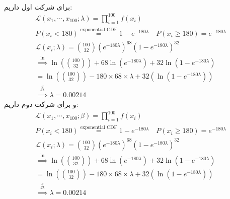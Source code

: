 \\
برای شرکت اول داریم:
\begin{gather*}
    \mathcal{L}(x_1,\cdots ,x_{100};\lambda) = \prod_{i=1}^{100} f(x_i)\\
    P(x_i < 180) \stackrel{\text{exponential CDF}}{=} 1 - e^{-180\lambda} \quad P(x_i \ge 180) = e^{-180\lambda}\\
    \mathcal{L}(x_i;\lambda) = {100 \choose 32} ( e^{-180\lambda})^{68} (1 - e^{-180\lambda})^{32}\\
    \stackrel{\ln}{\implies} \ln({100 \choose 32}) + 68 \ln( e^{-180\lambda}) + 32 \ln(1 - e^{-180\lambda})\\
    = \ln({100 \choose 32}) - 180 \times 68 \times \lambda + 32 (\ln(1 - e^{-180\lambda}))\\
    \stackrel{\frac{d}{d\lambda}}{\implies} \lambda = 0.00214
\end{gather*}
و برای شرکت دوم داریم:
\begin{gather*}
    \mathcal{L}(x_1,\cdots ,x_{100};\beta) = \prod_{i=1}^{100} f(x_i)\\
    P(x_i < 180) \stackrel{\text{exponential CDF}}{=} 1 - e^{-180\lambda} \quad P(x_i \ge 180) = e^{-180\lambda}\\
    \mathcal{L}(x_i;\lambda) = {100 \choose 32} ( e^{-180\lambda})^{68} (1 - e^{-180\lambda})^{32}\\
    \stackrel{\ln}{\implies} \ln({100 \choose 32}) + 68 \ln( e^{-180\lambda}) + 32 \ln(1 - e^{-180\lambda})\\
    = \ln({100 \choose 32}) - 180 \times 68 \times \lambda + 32 (\ln(1 - e^{-180\lambda}))\\
    \stackrel{\frac{d}{d\lambda}}{\implies} \lambda = 0.00214
\end{gather*}